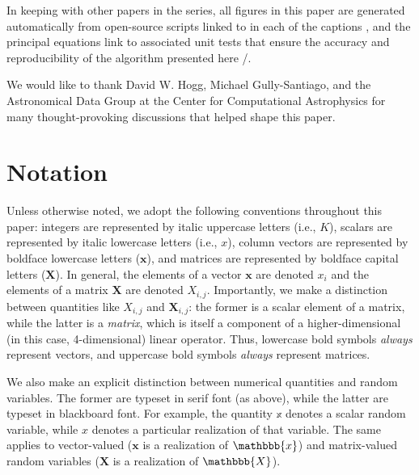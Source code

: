 \documentclass[modern]{aastex62}
\begin{document}
In keeping with other papers in the \starry series, all figures in this
paper are generated automatically from open-source scripts linked to in
each of the captions \codeicon, and the principal equations link to associated
unit tests that ensure the accuracy and reproducibility of the algorithm
presented here \testpassicon/\testfailicon.

%
%
%
%

\vspace{2em}

We would like to thank David W. Hogg, Michael Gully-Santiago, and the
Astronomical Data Group at the Center for Computational Astrophysics for
many thought-provoking discussions that helped shape this paper.



%
%
%
%

\pagebreak
\appendix

%
%
%
%

\afterpage{
    
    \vfill
    \clearpage
}

%
%
%
%

\section{Notation}
\label{sec:notation}
%
Unless otherwise noted, we adopt
the following conventions throughout this paper:
integers are represented by italic uppercase letters (i.e., $K$),
scalars are represented by italic lowercase
letters (i.e., $x$), column vectors are
represented by boldface lowercase letters
($\mathbf{x}$), and matrices are represented
by boldface capital letters ($\mathbf{X}$). In general, the elements of a vector
$\mathbf{x}$ are denoted $x_i$ and the elements of a matrix $\mathbf{X}$
are denoted $X_{i,j}$. Importantly, we make a distinction between
quantities like $X_{i,j}$ and $\mathbf{X}_{i,j}$: the former is a scalar
element of a matrix, while the latter is a \emph{matrix}, which is itself
a component of a higher-dimensional (in this case, 4-dimensional) linear
operator. Thus, lowercase bold symbols \emph{always} represent vectors, and
uppercase bold symbols \emph{always} represent matrices.

We also make an explicit distinction
between numerical quantities and random variables. The former are typeset
in serif font (as above), while the latter are typeset in blackboard font.
For example, the quantity $\mathbb{x}$ denotes a scalar random variable,
while $x$ denotes a particular realization of that variable. The same
applies to vector-valued ($\mathbf{x}$ is a realization of $\mathbbb{x}$)
and matrix-valued random variables
($\mathbf{X}$ is a realization of $\mathbbb{X}$).
\end{document}
